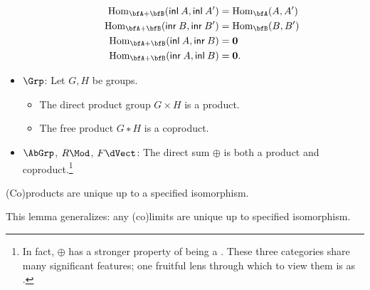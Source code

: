 \documentclass[a5paper]{article}
\begin{document}
\begin{example}
\begin{itemize}
\begin{itemize}
\begin{align*}
            \Hom_{\bfA+\bfB}(\apply{\inl}{A}, \apply{\inl}{A'}) &= \Hom_{\bfA}(A,A') \\
            \Hom_{\bfA+\bfB}(\apply{\inr}{B}, \apply{\inr}{B'}) &= \Hom_{\bfB}(B,B') \\
            \Hom_{\bfA+\bfB}(\apply{\inl}{A}, \apply{\inr}{B}) &= \emptytype \\
            \Hom_{\bfA+\bfB}(\apply{\inr}{A}, \apply{\inl}{B}) &= \emptytype.
          \end{align*}
      \end{itemize}
    \item $\Grp$: Let $G,H$ be groups.
      \begin{itemize}\renewcommand{\labelitemi}{$\circ $}
        \itemsep-0.2em
        \item \vspace{-0.6em} The direct product group $G\times H$ is a product.
        \item The free product $G∗H$ is a coproduct.
      \end{itemize}
    \item $\AbGrp$, $R\Mod$, $F\dVect$: The direct sum $⊕$ is both a product and
      coproduct.\footnote{In fact, $⊕$ has a stronger property of being a
      . These three categories share many significant
      features; one fruitful lens through which to view them is as
      .} 
  \end{itemize}
\end{example}

\begin{lemma}
	(Co)products are unique up to a specified isomorphism.
\end{lemma}

This lemma generalizes: any (co)limits are unique up to specified isomorphism.
\end{document}
